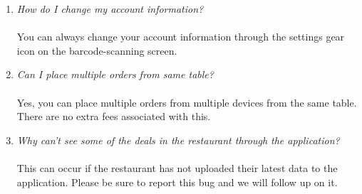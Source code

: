 \documentclass[12pt, titlepage]{article}
\begin{document}
\begin{enumerate}
	\item \emph{How do I change my account information?}\\\\
	You can always change your account information through the settings gear icon on the barcode-scanning screen.
	\item \emph{Can I place multiple orders from same table?}\\\\
	Yes, you can place multiple orders from multiple devices from the same table. There are no extra fees associated with this. 
	\item \emph{Why can't see some of the deals in the restaurant through the application?}\\\\
	This can occur if the restaurant has not uploaded their latest data to the application. Please be sure to report this bug and we will follow up on it.
\end{enumerate}
	
\end{document}
